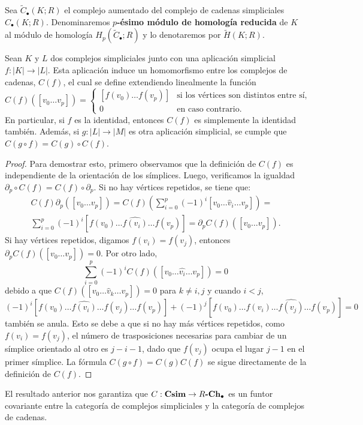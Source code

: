 \begin{definicion}
	Sea \(\widetilde{C}_{\bullet}(K;R)\) el complejo aumentado del complejo de cadenas
	simpliciales \(C_{\bullet}(K;R)\). Denominaremos \textbf{\(p\)-ésimo módulo de
		homología reducida} de \(K\) al módulo de homología \(H_{p}(\widetilde{C}_{\bullet}
	;R)\) y lo denotaremos por \(\widetilde{H}(K;R)\).
\end{definicion}

\begin{proposicion}
	\label{prop:simpl_app_hom} Sean \(K\) y \(L\) dos complejos simpliciales junto con
	una aplicación simplicial \(f: |K| \to |L|\). Esta aplicación induce un
	homomorfismo entre los complejos de cadenas, \(C(f)\), el cual se define
	extendiendo linealmente la función
	\[
	C(f)([v_{0}\ldots v_{p}]) =
	\begin{cases}
		[f(v_{0}) \ldots f(v_{p})] & \text{si los vértices son distintos entre sí}, \\
		0                          & \text{en caso contrario}.
	\end{cases}
	\]
	En particular, si \(f\) es la identidad, entonces \(C(f)\) es simplemente la
	identidad también. Además, si \(g: |L| \longrightarrow |M|\) es otra aplicación
	simplicial, se cumple que \(C(g \circ f) = C(g) \circ C(f)\).
\end{proposicion}
\begin{proof}
	Para demostrar esto, primero observamos que la definición de \(C(f)\) es
	independiente de la orientación de los símplices. Luego, verificamos la
	igualdad \(\partial_{p}\circ C(f) = C(f) \circ \partial_{p}\). Si no hay vértices
	repetidos, se tiene que:
	\begin{gather*}
		C(f) \partial_{p}([v_{0}\ldots v_{p}]) = C(f) \left( \sum_{i=0}^{p}(-1)^{i}[v
		_{0}\ldots \hat{v}_{i}\ldots v_{p}] \right) = \\ \sum_{i=0}^{p}(-1)^{i}[f(v_{0}
		) \ldots \widehat{f(v_i)}\ldots f(v_{p})] = \partial_{p}C(f)([v_{0}\ldots v_{p}
		]).
	\end{gather*}
	Si hay vértices repetidos, digamos \(f(v_{i}) = f(v_{j})\), entonces \(\partial_{p}
	C(f)([v_{0}\ldots v_{p}]) = 0\). Por otro lado,
	\[
	\sum_{i=0}^{p}(-1)^{i}C(f)([v_{0}\ldots \hat{v_i}\ldots v_{p}]) = 0
	\]
	debido a que \(C(f)([v_{0}\ldots \hat{v}_{k}\ldots v_{p}]) = 0\) para \(k \neq i,j\)
	y cuando \(i < j\),
	\[
	(-1)^{i}[f(v_{0}) \ldots \widehat{f(v_i)}\ldots f(v_{j}) \ldots f(v_{p})] + (
	-1)^{j}[f(v_{0}) \ldots f(v_{i}) \ldots \widehat{f(v_j)}\ldots f(v_{p})] = 0
	\]
	también se anula. Esto se debe a que si no hay más vértices repetidos, como
	\(f(v_{i}) = f(v_{j})\), el número de trasposiciones necesarias para cambiar de un
	símplice orientado al otro es \(j-i-1\), dado que \(f(v_{j})\) ocupa el lugar
	\(j-1\) en el primer símplice. La fórmula \(C(g \circ f)=C(g)C(f)\) se sigue directamente
	de la definición de \(C(f)\).
\end{proof}
\begin{observacion}
	El resultado anterior nos garantiza que \(C: \mathbf{Csim}\to R \textbf{-}\mathbf{Ch_\bullet}\)
	es un funtor covariante entre la categoría de complejos simpliciales y la categoría
	de complejos de cadenas.
\end{observacion}

